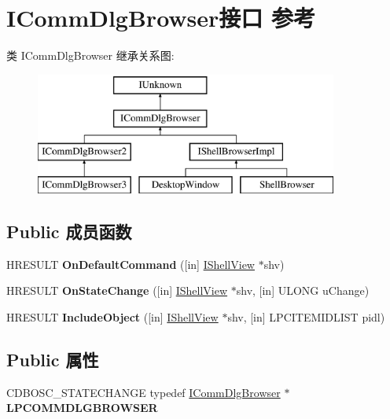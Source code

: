 \hypertarget{interface_i_comm_dlg_browser}{}\section{I\+Comm\+Dlg\+Browser接口 参考}
\label{interface_i_comm_dlg_browser}
类 I\+Comm\+Dlg\+Browser 继承关系图\+:\begin{figure}[H]
\begin{center}
\leavevmode
\includegraphics[height=4.000000cm]{interface_i_comm_dlg_browser}
\end{center}
\end{figure}
\subsection*{Public 成员函数}
\begin{DoxyCompactItemize}
\item 
\mbox{\label{interface_i_comm_dlg_browser_a379aeb5e242b4d1010a65344c0b84a3a}} 
H\+R\+E\+S\+U\+LT {\bfseries On\+Default\+Command} (\mbox{[}in\mbox{]} \hyperlink{interface_i_shell_view}{I\+Shell\+View} $\ast$shv)
\item 
\mbox{\label{interface_i_comm_dlg_browser_a62dc8b63481283a08e1c2a49502bf571}} 
H\+R\+E\+S\+U\+LT {\bfseries On\+State\+Change} (\mbox{[}in\mbox{]} \hyperlink{interface_i_shell_view}{I\+Shell\+View} $\ast$shv, \mbox{[}in\mbox{]} U\+L\+O\+NG u\+Change)
\item 
\mbox{\label{interface_i_comm_dlg_browser_af4324cc54ba494b1c956508e26976c1d}} 
H\+R\+E\+S\+U\+LT {\bfseries Include\+Object} (\mbox{[}in\mbox{]} \hyperlink{interface_i_shell_view}{I\+Shell\+View} $\ast$shv, \mbox{[}in\mbox{]} L\+P\+C\+I\+T\+E\+M\+I\+D\+L\+I\+ST pidl)
\end{DoxyCompactItemize}
\subsection*{Public 属性}
\begin{DoxyCompactItemize}
\item 
\mbox{\label{interface_i_comm_dlg_browser_a6bbb954eed39bec263adeb6a9601880a}} 
C\+D\+B\+O\+S\+C\+\_\+\+S\+T\+A\+T\+E\+C\+H\+A\+N\+GE typedef \hyperlink{interface_i_comm_dlg_browser}{I\+Comm\+Dlg\+Browser} $\ast$ {\bfseries L\+P\+C\+O\+M\+M\+D\+L\+G\+B\+R\+O\+W\+S\+ER}
\end{DoxyCompactItemize}
